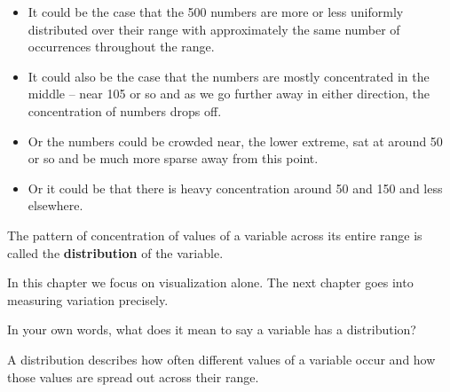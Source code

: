\documentclass[
  12pt,
  letterpaper,
  DIV=11,
  numbers=noendperiod]{scrreprt}
\providecommand{\tightlist}{%
  \setlength{\itemsep}{0pt}\setlength{\parskip}{0pt}}
\begin{document}
\begin{itemize}
\tightlist
\item
  It could be the case that the 500 numbers are more or less uniformly
  distributed over their range with approximately the same number of
  occurrences throughout the range.\\
\item
  It could also be the case that the numbers are mostly concentrated in
  the middle -- near 105 or so and as we go further away in either
  direction, the concentration of numbers drops off.
\item
  Or the numbers could be crowded near, the lower extreme, sat at around
  50 or so and be much more sparse away from this point.
\item
  Or it could be that there is heavy concentration around 50 and 150 and
  less elsewhere.
\end{itemize}

The pattern of concentration of values of a variable across its entire
range is called the \textbf{distribution} of the variable.

In this chapter we focus on visualization alone. The next chapter goes
into measuring variation precisely.

\begin{tcolorbox}[enhanced jigsaw, colback=white, leftrule=.75mm, toprule=.15mm, bottomtitle=1mm, breakable, coltitle=black, toptitle=1mm, title={Quick Check}, opacitybacktitle=0.6, colbacktitle=quarto-callout-note-color!10!white, arc=.35mm, left=2mm, colframe=quarto-callout-note-color-frame, titlerule=0mm, rightrule=.15mm, bottomrule=.15mm, opacityback=0]

In your own words, what does it mean to say a variable has a
distribution?

\end{tcolorbox}

\begin{tcolorbox}[enhanced jigsaw, colback=white, leftrule=.75mm, toprule=.15mm, bottomtitle=1mm, breakable, coltitle=black, toptitle=1mm, title={Suggested answer}, opacitybacktitle=0.6, colbacktitle=quarto-callout-note-color!10!white, arc=.35mm, left=2mm, colframe=quarto-callout-note-color-frame, titlerule=0mm, rightrule=.15mm, bottomrule=.15mm, opacityback=0]

A distribution describes how often different values of a variable occur
and how those values are spread out across their range.

\end{tcolorbox}
\end{document}
